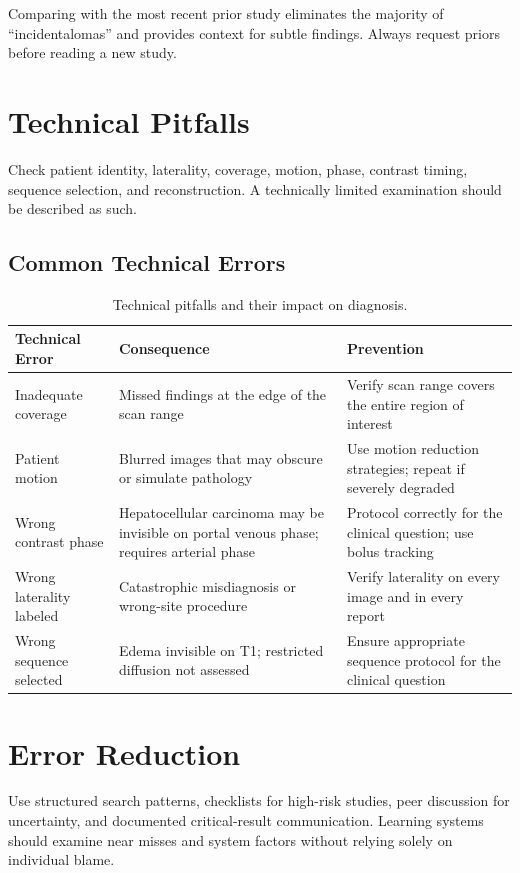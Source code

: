 \begin{pearlbox}
Comparing with the most recent prior study eliminates the majority of ``incidentalomas'' and provides context for subtle findings. Always request priors before reading a new study.
\end{pearlbox}

\section{Technical Pitfalls}
Check patient identity, laterality, coverage, motion, phase, contrast timing, sequence selection, and reconstruction. A technically limited examination should be described as such.

\subsection{Common Technical Errors}
\begin{table}[h]
\centering
\caption{Technical pitfalls and their impact on diagnosis.}
\label{tab:technical_pitfalls}
\begin{tabular}{p{3.5cm} p{5cm} p{5cm}}
\toprule
\textbf{Technical Error} & \textbf{Consequence} & \textbf{Prevention} \\
\midrule
Inadequate coverage & Missed findings at the edge of the scan range & Verify scan range covers the entire region of interest \\
Patient motion & Blurred images that may obscure or simulate pathology & Use motion reduction strategies; repeat if severely degraded \\
Wrong contrast phase & Hepatocellular carcinoma may be invisible on portal venous phase; requires arterial phase & Protocol correctly for the clinical question; use bolus tracking \\
Wrong laterality labeled & Catastrophic misdiagnosis or wrong-site procedure & Verify laterality on every image and in every report \\
Wrong sequence selected & Edema invisible on T1; restricted diffusion not assessed & Ensure appropriate sequence protocol for the clinical question \\
\bottomrule
\end{tabular}
\end{table}

\section{Error Reduction}
Use structured search patterns, checklists for high-risk studies, peer discussion for uncertainty, and documented critical-result communication. Learning systems should examine near misses and system factors without relying solely on individual blame.

